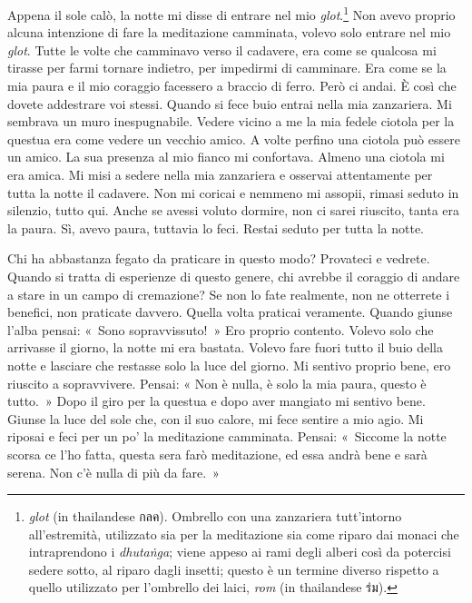 Appena il sole calò, la notte mi disse di entrare nel mio
\emph{glot}.\footnote{\emph{glot} (in thailandese กลค). Ombrello con una
  zanzariera tutt'intorno all'estremità, utilizzato sia per la
  meditazione sia come riparo dai monaci che intraprendono i
  \emph{dhutaṅga}; viene appeso ai rami degli alberi così da potercisi
  sedere sotto, al riparo dagli insetti; questo è un termine diverso
  rispetto a quello utilizzato per l'ombrello dei laici, \emph{rom} (in
  thailandese ร่ม).} Non avevo proprio alcuna intenzione di fare la
meditazione camminata, volevo solo entrare nel mio \emph{glot}. Tutte le
volte che camminavo verso il cadavere, era come se qualcosa mi tirasse
per farmi tornare indietro, per impedirmi di camminare. Era come se la
mia paura e il mio coraggio facessero a braccio di ferro. Però ci andai.
È così che dovete addestrare voi stessi. Quando si fece buio entrai
nella mia zanzariera. Mi sembrava un muro inespugnabile. Vedere vicino a
me la mia fedele ciotola per la questua era come vedere un vecchio
amico. A volte perfino una ciotola può essere un amico. La sua presenza
al mio fianco mi confortava. Almeno una ciotola mi era amica. Mi misi a
sedere nella mia zanzariera e osservai attentamente per tutta la notte
il cadavere. Non mi coricai e nemmeno mi assopii, rimasi seduto in
silenzio, tutto qui. Anche se avessi voluto dormire, non ci sarei
riuscito, tanta era la paura. Sì, avevo paura, tuttavia lo feci. Restai
seduto per tutta la notte.

Chi ha abbastanza fegato da praticare in questo modo? Provateci e
vedrete. Quando si tratta di esperienze di questo genere, chi avrebbe il
coraggio di andare a stare in un campo di cremazione? Se non lo fate
realmente, non ne otterrete i benefici, non praticate davvero. Quella
volta praticai veramente. Quando giunse l'alba pensai: «~Sono
sopravvissuto!~» Ero proprio contento. Volevo solo che arrivasse il
giorno, la notte mi era bastata. Volevo fare fuori tutto il buio della
notte e lasciare che restasse solo la luce del giorno. Mi sentivo
proprio bene, ero riuscito a sopravvivere. Pensai: « Non è nulla, è solo
la mia paura, questo è tutto.~» Dopo il giro per la questua e dopo aver
mangiato mi sentivo bene. Giunse la luce del sole che, con il suo
calore, mi fece sentire a mio agio. Mi riposai e feci per un po' la
meditazione camminata. Pensai: «~Siccome la notte scorsa ce l'ho fatta,
questa sera farò meditazione, ed essa andrà bene e sarà serena. Non c'è
nulla di più da fare.~»

